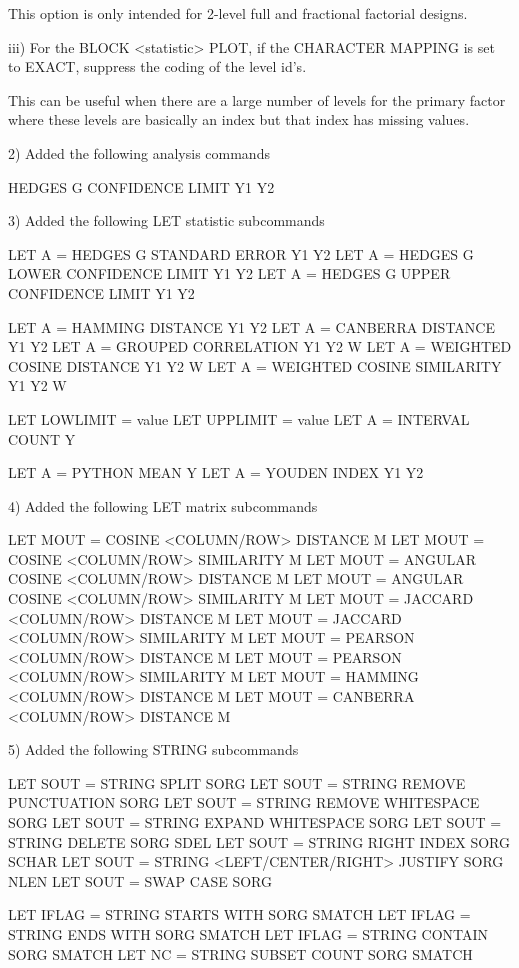          This option is only intended for 2-level full and fractional
         factorial designs.

    iii) For the BLOCK <statistic> PLOT, if the CHARACTER MAPPING
         is set to EXACT, suppress the coding of the level id's.

         This can be useful when there are a large number of levels
         for the primary factor where these levels are basically
         an index but that index has missing values.

 2) Added the following analysis commands

      HEDGES G CONFIDENCE LIMIT Y1 Y2

 3) Added the following LET statistic subcommands

      LET A  = HEDGES G STANDARD ERROR Y1 Y2
      LET A  = HEDGES G LOWER CONFIDENCE LIMIT Y1 Y2
      LET A  = HEDGES G UPPER CONFIDENCE LIMIT Y1 Y2

      LET A  = HAMMING DISTANCE Y1 Y2
      LET A  = CANBERRA DISTANCE Y1 Y2
      LET A  = GROUPED CORRELATION Y1 Y2 W
      LET A  = WEIGHTED COSINE DISTANCE Y1 Y2 W
      LET A  = WEIGHTED COSINE SIMILARITY Y1 Y2 W

      LET LOWLIMIT = value
      LET UPPLIMIT = value
      LET A = INTERVAL COUNT Y

      LET A = PYTHON MEAN Y
      LET A = YOUDEN INDEX Y1 Y2

 4) Added the following LET matrix subcommands

      LET MOUT = COSINE <COLUMN/ROW> DISTANCE M
      LET MOUT = COSINE <COLUMN/ROW> SIMILARITY M
      LET MOUT = ANGULAR COSINE <COLUMN/ROW> DISTANCE M
      LET MOUT = ANGULAR COSINE <COLUMN/ROW> SIMILARITY M
      LET MOUT = JACCARD <COLUMN/ROW> DISTANCE M
      LET MOUT = JACCARD <COLUMN/ROW> SIMILARITY M
      LET MOUT = PEARSON <COLUMN/ROW> DISTANCE M
      LET MOUT = PEARSON <COLUMN/ROW> SIMILARITY M
      LET MOUT = HAMMING <COLUMN/ROW> DISTANCE M
      LET MOUT = CANBERRA <COLUMN/ROW> DISTANCE M

 5) Added the following STRING subcommands

      LET SOUT = STRING SPLIT SORG
      LET SOUT = STRING REMOVE PUNCTUATION SORG
      LET SOUT = STRING REMOVE WHITESPACE SORG
      LET SOUT = STRING EXPAND WHITESPACE SORG
      LET SOUT = STRING DELETE SORG SDEL
      LET SOUT = STRING RIGHT INDEX SORG  SCHAR
      LET SOUT = STRING <LEFT/CENTER/RIGHT> JUSTIFY SORG NLEN
      LET SOUT = SWAP CASE SORG

      LET IFLAG = STRING STARTS WITH SORG SMATCH
      LET IFLAG = STRING ENDS   WITH SORG SMATCH
      LET IFLAG = STRING CONTAIN SORG SMATCH
      LET NC    = STRING SUBSET COUNT SORG SMATCH

